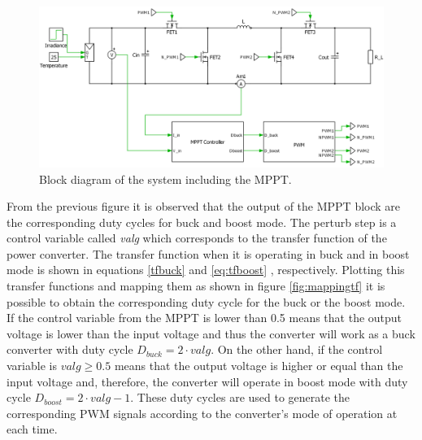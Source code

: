 \begin{figure}[H]
	\begin{center}
		\includegraphics[width=\textwidth]{../Pictures/BD_implementation_POalgorithm}
		\caption{Block diagram of the system including the MPPT.}
		\label{BD_POalgorithm}
	\end{center}	
\end{figure}

From the previous figure it is observed that the output of the MPPT block are the corresponding duty cycles for buck and boost mode. The perturb step is a control variable called \textit{valg} which corresponds to the transfer function of the power converter. 
The transfer function when it is operating in buck and in boost mode is shown in equations \ref{tfbuck} and \ref{eq:tfboost} , respectively. Plotting this transfer functions and mapping them as shown in figure \ref{fig:mappingtf} it is possible to obtain the corresponding duty cycle for the buck or the boost mode. If the control variable from the MPPT is lower than 0.5  means that the output voltage is lower than the input voltage and thus the converter will work as a buck converter with duty cycle $D_{buck}=2\cdot valg$. On the other hand, if the control variable is $valg \geq 0.5$ means that the output voltage is higher or equal than the input voltage and, therefore, the converter will operate in boost mode with duty cycle $D_{boost}=2\cdot valg - 1$. These duty cycles are used to generate the corresponding PWM signals according to the converter's mode of operation at each time. 

